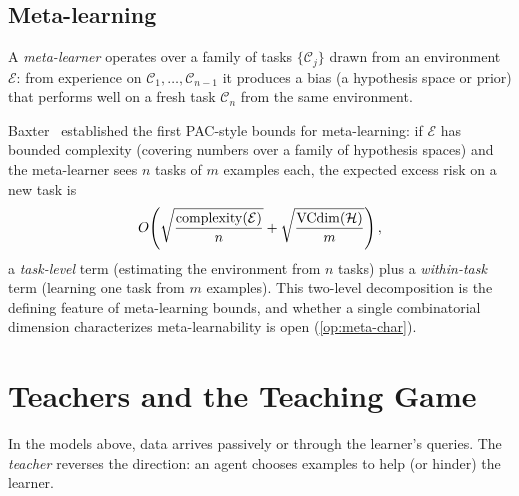 \subsection{Meta-learning}

\begin{defn}
\label{def:meta-learner}
A \emph{meta-learner} operates over a family of tasks $\{\mathcal{C}_j\}$ drawn from an environment $\mathcal{E}$: from experience on $\mathcal{C}_1, \ldots, \mathcal{C}_{n-1}$ it produces a bias (a hypothesis space or prior) that performs well on a fresh task $\mathcal{C}_n$ from the same environment.
\end{defn}

Baxter~\cite{Baxter2000} established the first PAC-style bounds for meta-learning: if $\mathcal{E}$ has bounded complexity (covering numbers over a family of hypothesis spaces) and the meta-learner sees $n$ tasks of $m$ examples each, the expected excess risk on a new task is
\[
O\!\left(\sqrt{\frac{\mathrm{complexity}(\mathcal{E})}{n}} + \sqrt{\frac{\mathrm{VCdim}(\mathcal{H})}{m}}\right),
\]
a \emph{task-level} term (estimating the environment from $n$ tasks) plus a \emph{within-task} term (learning one task from $m$ examples). This two-level decomposition is the defining feature of meta-learning bounds, and whether a single combinatorial dimension characterizes meta-learnability is open (\cref{op:meta-char}).


\section{Teachers and the Teaching Game}
\label{sec:teachers}

In the models above, data arrives passively or through the learner's queries. The \emph{teacher} reverses the direction: an agent chooses examples to help (or hinder) the learner.

